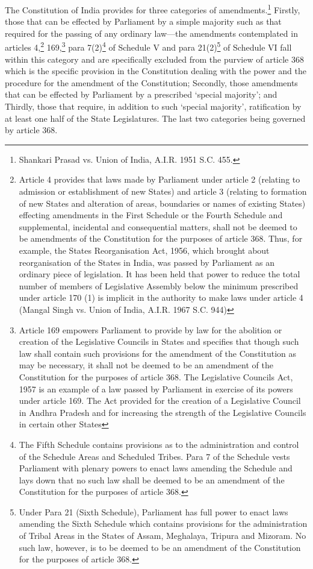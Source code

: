 \begin{multicols}{2}
\noi
The Constitution of India provides for three categories of amendments.\footnote{Shankari Prasad vs. Union of India, A.I.R. 1951 S.C. 455.} Firstly, those that can be effected by Parliament by a simple majority such as that required for the passing of any
ordinary law—the amendments contemplated in articles 4,\footnote{Article 4 provides that laws made by Parliament under article 2 (relating to admission or establishment of new States) and article 3 (relating to formation of new States and alteration of areas, boundaries or names of existing States) effecting amendments in the First Schedule or the Fourth Schedule and supplemental, incidental and consequential matters, shall not be deemed to be amendments of the Constitution for the purposes of article 368. Thus, for example, the States Reorganisation Act, 1956, which brought about reorganisation of the States in India,
was passed by Parliament as an ordinary piece of legislation. It has been held that power to reduce the total number
of members of Legislative Assembly below the minimum prescribed under article 170 (1) is implicit in the
authority to make laws under article 4 (Mangal Singh vs. Union of India, A.I.R. 1967 S.C. 944)} 169,\footnote{Article 169 empowers Parliament to provide by law for the abolition or creation of the Legislative Councils in
States and specifies that though such law shall contain such provisions for the amendment of the Constitution as
may be necessary, it shall not be deemed to be an amendment of the Constitution for the purposes of article 368.
The Legislative Councils Act, 1957 is an example of a law passed by Parliament in exercise of its powers under
article 169. The Act provided for the creation of a Legislative Council in Andhra Pradesh and for increasing the
strength of the Legislative Councils in certain other States} para 7(2)\footnote{The Fifth Schedule contains provisions as to the administration and control of the Schedule Areas and Scheduled Tribes. Para 7 of the Schedule vests Parliament with plenary powers to enact laws amending the Schedule and lays down that no such law shall be deemed to be an amendment of the Constitution for the purposes of article 368.} of Schedule V and para 21(2)\footnote{Under Para 21 (Sixth Schedule), Parliament has full power to enact laws amending the Sixth Schedule which contains provisions for the administration of Tribal Areas in the States of Assam, Meghalaya, Tripura and Mizoram. No such law, however, is to be deemed to be an amendment of the Constitution for the purposes of article 368.} of Schedule VI fall within this category and are specifically excluded from the purview of article 368 which is the specific provision in the Constitution dealing with the
power and the procedure for the amendment of the Constitution; Secondly, those amendments
that can be effected by Parliament by a prescribed ‘special majority’; and Thirdly, those that
require, in addition to such ‘special majority’, ratification by at least one half of the State
Legislatures. The last two categories being governed by article 368.


\end{multicols}
